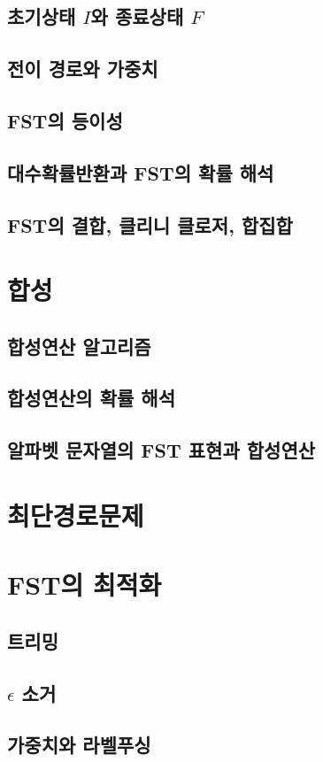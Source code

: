 \documentclass{book}
\begin{document}
\subsection{초기상태 $I$와 종료상태 $F$}
\subsection{전이 경로와 가중치}
\subsection{FST의 등이성}
\subsection{대수확률반환과 FST의 확률 해석}
\subsection{FST의 결합, 클리니 클로저, 합집합}
\section{합성}
\subsection{합성연산 알고리즘}
\subsection{합성연산의 확률 해석}
\subsection{알파벳 문자열의 FST 표현과 합성연산}
\section{최단경로문제}
\section{FST의 최적화}
\subsection{트리밍}
\subsection{$\epsilon$ 소거}
\subsection{가중치와 라벨푸싱}
\end{document}
